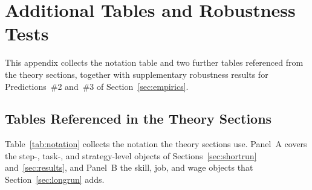 \section{Additional Tables and Robustness Tests}
\label{app:additional_robustness}

This appendix collects the notation table and two further tables referenced from the theory sections, together with supplementary robustness results for Predictions~\#2 and~\#3 of Section~\ref{sec:empirics}.


\subsection{Tables Referenced in the Theory Sections}
\label{app:theory_tables}
\label{app:jobdesign_example}

Table~\ref{tab:notation} collects the notation the theory sections use.
Panel~A covers the step-, task-, and strategy-level objects of Sections~\ref{sec:shortrun} and~\ref{sec:results}, and Panel~B the skill, job, and wage objects that Section~\ref{sec:longrun} adds.

